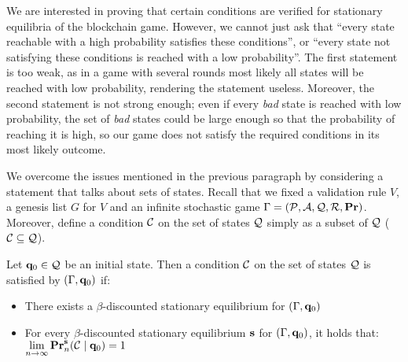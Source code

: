 We are interested in proving that certain conditions are verified for stationary equilibria of the blockchain game. 
However, we cannot just ask that ``every state reachable with a high probability satisfies these conditions'', or 
``every state not satisfying these conditions is reached with a low probability''. 
The first statement is too weak, as in a game with several rounds 
most likely all states will be reached with low probability, rendering the statement useless. Moreover, the second statement is not strong enough; even if every \emph{bad} state is reached with 
low probability, the set of \emph{bad} states could be large enough so that the probability of reaching it is high, so our game does not satisfy the  required conditions in its most likely outcome. 

We overcome the issues mentioned in the previous paragraph by considering a statement that talks about sets of states. Recall that we  fixed a validation rule $V$, a genesis list $G$ for $V$ and an infinite stochastic game $\Gamma = (\mathcal{P},\mathcal{A},\mathcal{Q},\mathcal{R},\mathbf{Pr})$. Moreover,  define a condition $\mathcal{C}$ on the set of states $\mathcal{Q}$ simply as a subset of $\mathcal{Q}$ ($\mathcal{C} \subseteq \mathcal{Q}$).

\begin{mydef}
Let $\mathbf{q}_0 \in \mathcal{Q}$ be an initial state. Then a condition $\mathcal{C}$ on the set of states $\mathcal{Q}$ is satisfied by $(\Gamma, \mathbf{q}_0)$ if:
	\begin{itemize}
		\item There exists a $\beta$-discounted stationary equilibrium for $(\Gamma, \mathbf{q}_0)$
		
		\item For every $\beta$-discounted stationary equilibrium $\mathbf{s}$ for $(\Gamma, \mathbf{q}_0)$, it holds that:
${\displaystyle \lim_{n \to \infty} \mathbf{Pr}_n^{\mathbf{s}}(\mathcal{C} \mid \mathbf{q}_0) = 1}$

		\end{itemize}
\end{mydef}


